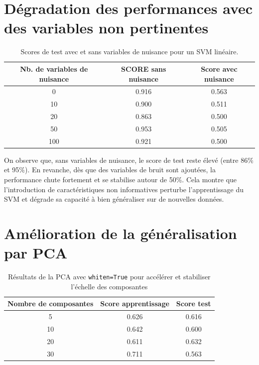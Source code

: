 \documentclass{rapport}
\begin{document}
\section{Dégradation des performances avec des variables non pertinentes}

\begin{table}[H]
\centering
\begin{tabular}{|c|c|c|}
\hline
\textbf{Nb. de variables de nuisance} & \textbf{SCORE sans nuisance} & \textbf{Score avec nuisance} \\ \hline
0   & 0.916 & 0.563 \\ \hline
10  & 0.900 & 0.511 \\ \hline
20  & 0.863 & 0.500 \\ \hline
50  & 0.953 & 0.505 \\ \hline
100 & 0.921 & 0.500 \\ \hline
\end{tabular}
\caption{Scores de test avec et sans variables de nuisance pour un SVM linéaire.}
\label{tab:svm_nuisance}
\end{table}

On observe que, sans variables de nuisance, le score de test reste élevé (entre 86\% et 95\%). 
En revanche, dès que des variables de bruit sont ajoutées, la performance chute fortement et se stabilise autour de 50\%. 
Cela montre que l’introduction de caractéristiques non informatives perturbe l’apprentissage du SVM 
et dégrade sa capacité à bien généraliser sur de nouvelles données.


\section{Amélioration de la généralisation par PCA }

\begin{table}[H]
\centering

\begin{tabular}{|c|c|c|}
\hline
\textbf{Nombre de composantes} & \textbf{Score apprentissage} & \textbf{Score test} \\
\hline
5  & 0.626 & 0.616 \\ \hline
10 & 0.642 & 0.600 \\ \hline
20 & 0.611 & 0.632 \\ \hline
30 & 0.711 & 0.563 \\
\hline
\end{tabular}
\label{tab:pca_svm}
\caption{Résultats de la PCA avec \texttt{whiten=True} pour accélérer et stabiliser l’échelle des composantes}
\end{table}
\end{document}
